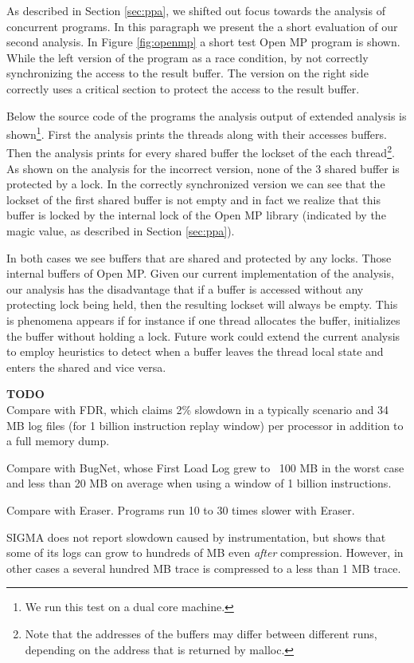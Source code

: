 As described in Section \ref{sec:ppa}, we shifted out focus towards
the analysis of concurrent programs. In this paragraph we present the
a short evaluation of our second analysis. In Figure \ref{fig:openmp}
a short test Open MP program is shown. While the left version of the
program as a race condition, by not correctly synchronizing the access
to the result buffer. The version on the right side correctly uses a
critical section to protect the access to the result buffer.

Below the source code of the programs the analysis output of extended
analysis is shown\footnote{We run this test on a dual core
  machine.}. First the analysis prints the threads along with their
accesses buffers. Then the analysis prints for every shared buffer the
lockset of the each thread\footnote{Note that the addresses of the
  buffers may differ between different runs, depending on the address
  that is returned by malloc.}. As shown on the analysis for the
incorrect version, none of the 3 shared buffer is protected by a
lock. In the correctly synchronized version we can see that the
lockset of the first shared buffer is not empty and in fact we realize
that this buffer is locked by the internal lock of the Open MP library
(indicated by the magic value, as described in Section \ref{sec:ppa}).

In both cases we see buffers that are shared and protected by any
locks. Those internal buffers of Open MP. Given our current
implementation of the analysis, our analysis has the disadvantage that
if a buffer is accessed without any protecting lock being held, then
the resulting lockset will always be empty. This is phenomena appears
if for instance if one thread allocates the buffer, initializes the
buffer without holding a lock. Future work could extend the current
analysis to employ heuristics to detect when a buffer leaves the
thread local state and enters the shared and vice versa.

\textbf{TODO} \\
Compare with FDR, which claims 2\% slowdown in a typically scenario
and 34 MB log files (for 1 billion instruction replay window)
per processor in addition to a full memory dump.

Compare with BugNet, whose First Load Log grew to ~100 MB in the worst
case and less than 20 MB on average when using a window of 1
billion instructions.

Compare with Eraser.  Programs run 10 to 30 times slower with Eraser.

SIGMA does not report slowdown caused by instrumentation, but shows
that some of its logs can grow to hundreds of MB even \emph{after} compression.
However, in other cases a several hundred MB trace is compressed
to a less than 1 MB trace.

